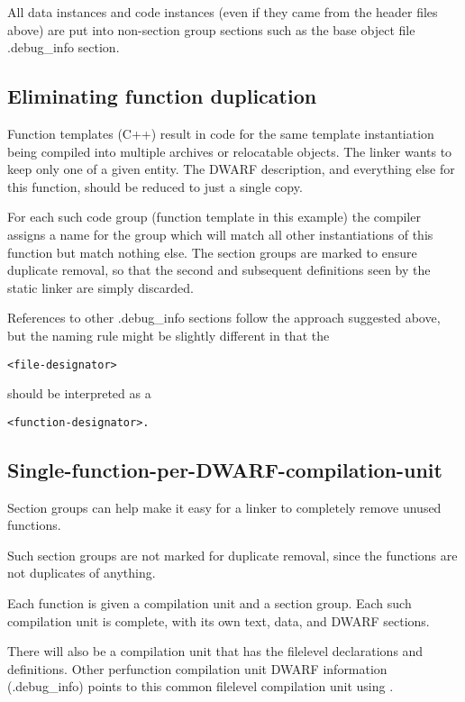 All data instances and code instances (even if they came
from the header files above) are put into non-section group
sections such as the base object file .debug\_info section.

\subsection{Eliminating function duplication}
\label{app:eliminatingfunctionduplication}


Function templates (C++) result in code for the same template
instantiation being compiled into multiple archives or
relocatable objects. The linker wants to keep only one of a
given entity. The DWARF description, and everything else for
this function, should be reduced to just a single copy.

For each such code group (function template in this example)
the compiler assigns a name for the group which will match
all other instantiations of this function but match nothing
else. The section groups are marked to ensure duplicate
removal, so that the second and subsequent definitions seen
by the static linker are simply discarded.


References to other .debug\_info sections follow the approach
suggested above, but the naming rule might be slightly
different in that the 
\begin{alltt}
<file-designator> 
\end{alltt}
should be interpreted
as a 
\begin{alltt}
<function-designator>.
\end{alltt}



\subsection{Single-function-per-DWARF-compilation-unit}
\label{app:singlefunctionperdwarfcompilationunit}

Section groups can help make it easy for a linker to completely
remove unused functions.

Such section groups are not marked for duplicate removal,
since the functions are not duplicates of anything.

Each function is given a compilation unit and a section
group. Each such compilation unit is complete, with its own
text, data, and DWARF sections.

There will also be a compilation unit that has the file\dash level
declarations and definitions. Other per\dash function compilation
unit DWARF information (.debug\_info) points to this common
file\dash level compilation unit using .


